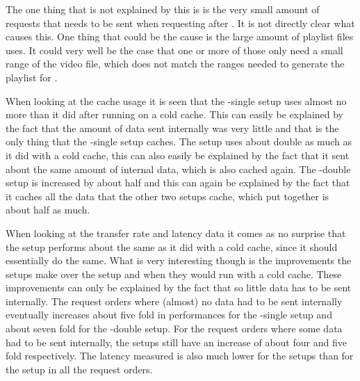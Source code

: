 \documentclass[twoside,openright]{uva-bachelor-thesis}
\begin{document}
The one thing that is not explained by this is is the very small amount of
requests that needs to be sent when requesting \hls after \hds. It is not
directly clear what causes this. One thing that could be the cause is the large
amount of playlist files \hls uses. It could very well be the case that one or
more of those only need a small range of the video file, which does not match
the ranges needed to generate the playlist for \hds.

When looking at the cache usage it is seen that the \lt-single setup uses almost
no more than it did after running on a cold cache. This can easily be explained
by the fact that the amount of data sent internally was very little and that is
the only thing that the \lt-single setup caches. The \cdn setup uses about
double as much as it did with a cold cache, this can also easily be explained by
the fact that it sent about the same amount of internal data, which is also
cached again. The \lt-double setup is increased by about half and this can again
be explained by the fact that it caches all the data that the other two setups
cache, which put together is about half as much.

When looking at the transfer rate and latency data it comes as no surprise that
the \cdn setup performs about the same as it did with a cold cache, since it
should essentially do the same. What is very interesting though is the
improvements the \lt setups make over the \cdn setup and when they would run
with a cold cache. These improvements can only be explained by the fact that so
little data has to be sent internally. The request orders where (almost) no data
had to be sent internally eventually increases about five fold in performances
for the \lt-single setup and about seven fold for the \lt-double setup. For the
request orders where some data had to be sent internally, the setups still have
an increase of about four and five fold respectively. The latency measured is
also much lower for the \lt setups than for the \cdn setup in all the request
orders.
\end{document}
